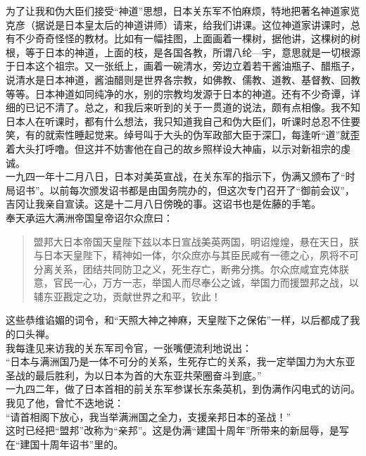 为了让我和伪大臣们接受“神道”思想，日本关东军不怕麻烦，特地把著名神道家览克彦（据说是日本皇太后的神道讲师）请来，给我们讲课。这位神道家讲课时，总有不少奇奇怪怪的教材。比如有一幅挂图，上面画着一棵树，据他讲，这棵树的树根，等于日本的神道，上面的枝，是各国各教，所谓八纶—宇，意思就是一切根源于日本这个祖宗。又一张纸上，画着一碗清水，旁边立着若干酱油瓶子、醋瓶子，说清水是日本神道，酱油醋则是世界各宗教，如佛教、儒教、道教、基督教、回教等等。日本神道如同纯净的水，别的宗教均发源于日本的神道。还有不少奇谭，详细的已记不清了。总之，和我后来听到的关于一贯道的说法，颇有点相像。我不知日本人在听课时，都有什么想法，我只知道我自己和伪大臣们，听课时总忍不住要笑，有的就索性睡起觉来。绰号叫于大头的伪军政部大臣于深囗，每逢听“道”就歪着大头打呼噜。但这并不妨害他在自己的故乡照样设大神庙，以示对新祖宗的虔诚。\\

一九四一年十二月八日，日本对美英宣战，在关东军的指示下，伪满又颁布了“时局诏书”。以前每次颁发诏书都是由国务院办的，但这次专门召开了“御前会议”，吉冈让我亲自宣读。这是十二月八日傍晚的事。这诏书也是佐藤的手笔。\\

奉天承运大满洲帝国皇帝诏尔众庶曰：\\

\begin{quote}
	盟邦大日本帝国天皇陛下兹以本日宣战美英两国，明诏煌煌，悬在天日，朕与日本天皇陛下，精神如一体，尔众庶亦与其臣民咸有一德之心，夙将不可分离关系，团结共同防卫之义，死生存亡，断弗分携。尔众庶咸宜克体朕意，官民一心，万方一志，举国人而尽奉公之诚，举国力而援盟邦之战，以辅东亚戡定之功，贡献世界之和平，钦此！
\end{quote}

这些恭维谄媚的词令，和“天照大神之神麻，天皇陛下之保佑”一样，以后都成了我的口头禅。\\

我每逢见来访我的关东军司令官，一张嘴便流利地说出：\\

“日本与满洲国乃是一体不可分的关系，生死存亡的关系，我一定举国力为大东亚圣战的最后胜利，为以日本为首的大东亚共荣圈奋斗到底。”\\

一九四二年，做了日本首相的前关东军参谋长东条英机，到伪满作闪电式的访问。我见了他，曾忙不迭地说：\\

“请首相阁下放心，我当举满洲国之全力，支援亲邦日本的圣战！”\\

这时已经把“盟邦”改称为“亲邦”。这是伪满“建国十周年”所带来的新屈辱，是写在“建国十周年诏书”里的。\\

